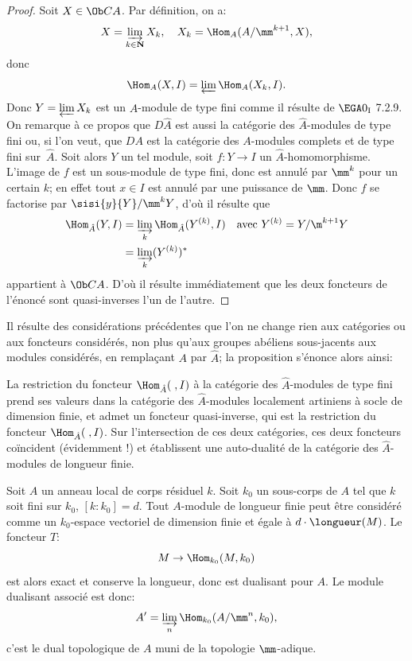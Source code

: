 \begin{proof}
Soit $X\in \Ob CA$. Par d\'efinition, on a:
$$
X=\varinjlim_{k\in {\bf N}}X_{k}, \quad X_{k}=\Hom_{A}(A/\mm^{k+1}, X),
$$
donc
$$
\Hom_{A}(X, I)=\varprojlim \Hom_{A}(X_{k}, I).
$$
Donc $Y=\varprojlim X_{k}$ est un $\hat{A}$-module de type fini comme il r\'esulte de $\EGA 0_{\textup{I}}$ 7.2.9. On remarque \`a ce propos que $D\hat{A}$ est aussi la cat\'egorie des $\hat{A}$-modules de type fini ou, si l'on veut, que $DA$ est la cat\'egorie des $A$-modules complets et de type fini sur~$\hat{A}$. Soit alors $Y$ un tel module, soit $f:Y\to I$ un $\hat{A}$-homomorphisme. L'image de $f$ est un sous-module de type fini, donc est annul\'e par $\mm^{k}$ pour un certain $k$; en effet tout $x\in I$ est annul\'e par une puissance de $\mm$. Donc $f$ se factorise par $\sisi{y}{Y}/\mm^{k}Y$, d'o\`u il r\'esulte que
\begin{align*}
\Hom_{\hat{A}}(Y, I)&=\varinjlim_k\Hom_{\hat{A}}(Y^{(k)}, I)\quad\text{avec } Y^{(k)}=Y/\m^{k+1}Y\\
&=\varinjlim_k(Y^{(k)})^*
\end{align*}
appartient \`a $\Ob CA$. D'o\`u il r\'esulte imm\'ediatement que les deux foncteurs de l'\'enonc\'e sont quasi-inverses l'un de l'autre.
\skipqed
\end{proof}

Il r\'esulte des consid\'erations pr\'ec\'edentes que l'on ne change rien
aux cat\'egories ou aux foncteurs consid\'er\'es, non plus qu'aux
groupes ab\'eliens sous-jacents aux modules consid\'er\'es, en rempla\c
cant $A$ par $\hat{A}$; la proposition \pageoriginale s'\'enonce alors ainsi:

La restriction du foncteur $\Hom_{\hat{A}}(\;, I)$ \`a la cat\'egorie des $\hat{A}$-modules de type fini prend ses valeurs dans la cat\'egorie des $\hat{A}$-modules localement artiniens \`a socle de dimension finie, et admet un foncteur quasi-inverse, qui est la restriction du foncteur $\Hom_{\hat{A}}(\;, I)$. Sur l'intersection de ces deux cat\'egories, ces deux foncteurs co\"incident (\'evidemment !) et \'etablissent une auto-dualit\'e de la cat\'egorie des $\hat{A}$-modules de longueur finie.

\begin{exemple}
\label{IV.5.2} Soit $A$ un anneau local de corps r\'esiduel $k$. Soit $k_{0}$ un sous-corps de $A$ tel que $k$ soit fini sur $k_{0}$, $[k:k_{0}]=d$. Tout $A$-module de longueur finie peut \^etre consid\'er\'e comme un $k_{0}$-espace vectoriel de dimension finie et \'egale \`a $d\cdot\longueur(M)$. Le foncteur $T$:
$$
M\to \Hom_{k_{0}}(M, k_{0})
$$
est alors exact et conserve la longueur, donc est dualisant pour $A$. Le module dualisant associ\'e est donc:
$$
A'=\varinjlim_{n}\Hom_{k_{0}}(A/\mm^{n}, k_{0}),
$$
c'est le dual topologique de $A$ muni de la topologie $\mm$-adique.
\end{exemple}

